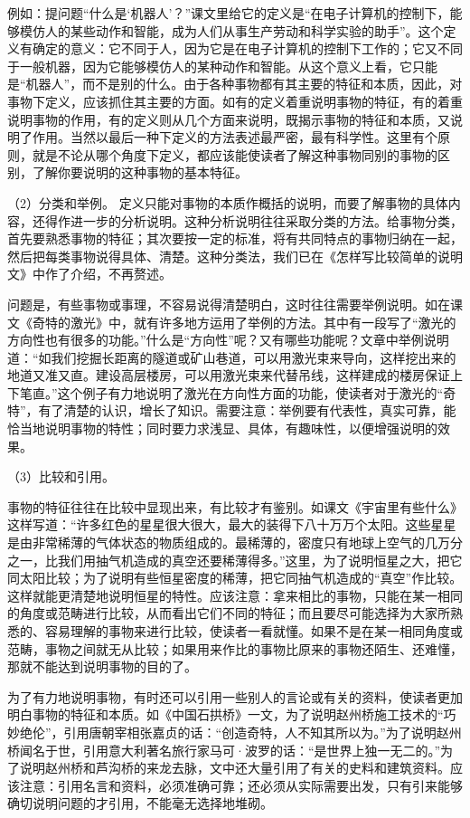 例如：提问题“什么是‘机器人’？”课文里给它的定义是“在电子计算机的控制下，能够模仿人的某些动作和智能，成为人们从事生产劳动和科学实验的助手”。这个定义有确定的意义：它不同于人，因为它是在电子计算机的控制下工作的；它又不同于一般机器，因为它能够模仿人的某种动作和智能。从这个意义上看，它只能是“机器人”，而不是别的什么。由于各种事物都有其主要的特征和本质，因此，对事物下定义，应该抓住其主要的方面。如有的定义着重说明事物的特征，有的着重说明事物的作用，有的定义则从几个方面来说明，既揭示事物的特征和本质，又说明了作用。当然以最后一种下定义的方法表述最严密，最有科学性。这里有个原则，就是不论从哪个角度下定义，都应该能使读者了解这种事物同别的事物的区别，了解你要说明的这种事物的基本特征。

（2）分类和举例。
定义只能对事物的本质作概括的说明，而要了解事物的具体内容，还得作进一步的分析说明。这种分析说明往往采取分类的方法。给事物分类，首先要熟悉事物的特征；其次要按一定的标准，将有共同特点的事物归纳在一起，然后把每类事物说得具体、清楚。这种分类法，我们已在《怎样写比较简单的说明文》中作了介绍，不再赘述。

问题是，有些事物或事理，不容易说得清楚明白，这时往往需要举例说明。如在课文《奇特的激光》中，就有许多地方运用了举例的方法。其中有一段写了“激光的方向性也有很多的功能。”什么是“方向性”呢？又有哪些功能呢？文章中举例说明道：“如我们挖掘长距离的隧道或矿山巷道，可以用激光束来导向，这样挖出来的地道又准又直。建设高层楼房，可以用激光束来代替吊线，这样建成的楼房保证上下笔直。”这个例子有力地说明了激光在方向性方面的功能，使读者对于激光的“奇特”，有了清楚的认识，增长了知识。需要注意：举例要有代表性，真实可靠，能恰当地说明事物的特性；同时要力求浅显、具体，有趣味性，以便增强说明的效果。

（3）比较和引用。

事物的特征往往在比较中显现出来，有比较才有鉴别。如课文《宇宙里有些什么》这样写道：“许多红色的星星很大很大，最大的装得下八十万万个太阳。这些星星是由非常稀薄的气体状态的物质组成的。最稀薄的，密度只有地球上空气的几万分之一，比我们用抽气机造成的真空还要稀薄得多。”这里，为了说明恒星之大，把它同太阳比较；为了说明有些恒星密度的稀薄，把它同抽气机造成的“真空”作比较。这样就能更清楚地说明恒星的特性。应该注意：拿来相比的事物，只能在某一相同的角度或范畴进行比较，从而看出它们不同的特征；而且要尽可能选择为大家所熟悉的、容易理解的事物来进行比较，使读者一看就懂。如果不是在某一相同角度或范畴，事物之间就无从比较；如果用来作比的事物比原来的事物还陌生、还难懂，那就不能达到说明事物的目的了。

为了有力地说明事物，有时还可以引用一些别人的言论或有关的资料，使读者更加明白事物的特征和本质。如《中国石拱桥》一文，为了说明赵州桥施工技术的“巧妙绝伦”，引用唐朝宰相张嘉贞的话：“创造奇特，人不知其所以为。”为了说明赵州桥闻名于世，引用意大利著名旅行家马可·波罗的话：“是世界上独一无二的。”为了说明赵州桥和芦沟桥的来龙去脉，文中还大量引用了有关的史料和建筑资料。应该注意：引用名言和资料，必须准确可靠；还必须从实际需要出发，只有引来能够确切说明问题的才引用，不能毫无选择地堆砌。

